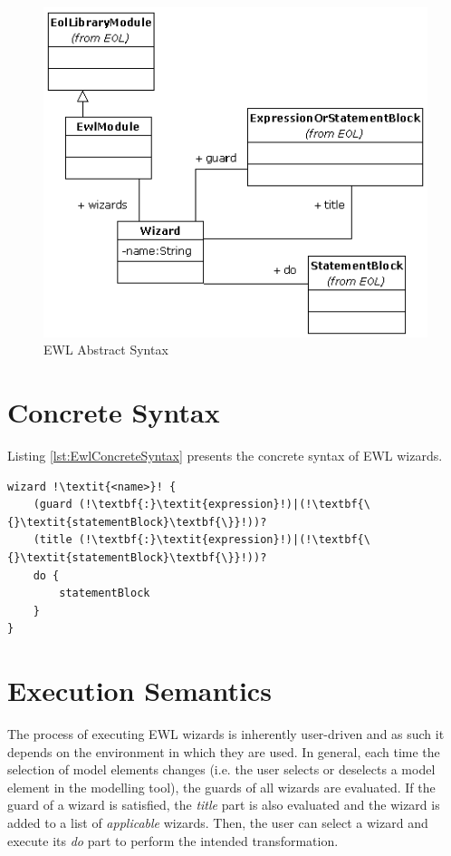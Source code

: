 \begin{figure}
	\centering
		\includegraphics{images/EwlAbstractSyntax.png}
	\caption{EWL Abstract Syntax}
	\label{fig:EwlAbstractSyntax}
\end{figure}

\clearpage

\section{Concrete Syntax}

Listing \ref{lst:EwlConcreteSyntax} presents the concrete syntax of EWL wizards.

\begin{lstlisting}[caption=Concrete syntax of EWL wizards, label=lst:EwlConcreteSyntax, language=EWL, escapechar=!]
wizard !\textit{<name>}! {
	(guard (!\textbf{:}\textit{expression}!)|(!\textbf{\{}\textit{statementBlock}\textbf{\}}!))?
	(title (!\textbf{:}\textit{expression}!)|(!\textbf{\{}\textit{statementBlock}\textbf{\}}!))?
	do {
		statementBlock
	}
}
\end{lstlisting}

\section{Execution Semantics}
The process of executing EWL wizards is inherently user-driven and as such it depends on the environment in which they are used. In general, each time the selection of model elements changes (i.e. the user selects or deselects a model element in the modelling tool), the guards of all wizards are evaluated. If the guard of a wizard is satisfied, the \emph{title} part is also evaluated and the wizard is added to a list of \textit{applicable} wizards. Then, the user can select a wizard and execute its \emph{do} part to perform the intended transformation.

